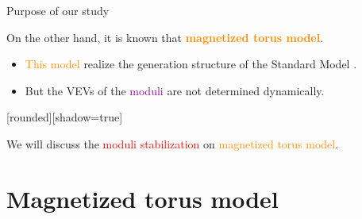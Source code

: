 \documentclass[
  unicode,a4paper,10pt,
  xcolor = {dvipsnames,svgnames},
  hyperref ={colorlinks=true,citecolor=Navy,linkcolor=NavyBlue,urlcolor=purple},
  ja=standard,lualatex
]{beamer}
\begin{document}
\begin{frame}{Purpose of our study}

  On the other hand, it is known that \textbf{\textcolor{DarkOrange}{magnetized torus model}}.

  \pause

  \begin{itemize}
    \item
          \textcolor{DarkOrange}{This model} realize the generation structure of the Standard Model \cite{Abe:2012ya,Abe:2017gye}.
    \item
          But the VEVs of the \textcolor{DarkMagenta}{moduli} are not determined dynamically.
  \end{itemize}

  \vspace*{15pt}

  \pause

  [rounded][shadow=true]

  \begin{block}{}
    \centering
    \large
    We will discuss the \textcolor{red}{moduli stabilization} on \textcolor{DarkOrange}{magnetized torus model}.
  \end{block}

\end{frame}


\section{Magnetized torus model}

\begin{frame}
  \huge \secname
\end{frame}
\end{document}
